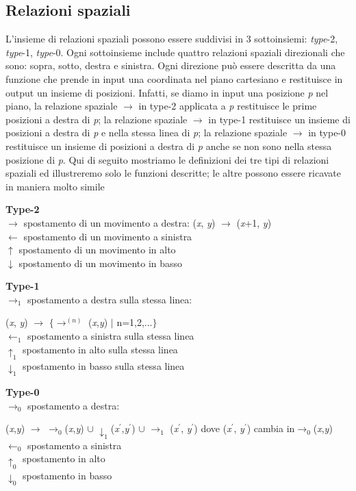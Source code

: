 \subsection{Relazioni spaziali}
L'insieme di relazioni spaziali \cite{pubblicazione: tomita} possono essere suddivisi in 3 sottoinsiemi: \textit{type}-2, \textit{type}-1, \textit{type}-0. Ogni sottoinsieme include quattro relazioni spaziali direzionali che sono: sopra, sotto, destra e sinistra. Ogni direzione può essere descritta da una funzione che prende in input una coordinata nel piano cartesiano e restituisce in output un insieme di posizioni. Infatti, se diamo in input una posizione \textit{p} nel piano, la relazione spaziale $\to$ in type-2 applicata a \textit{p} restituisce le prime posizioni a destra di \textit{p}; la relazione spaziale $\to$ in type-1 restituisce un insieme di posizioni a destra di \textit{p} e nella stessa linea di \textit{p}; la relazione spaziale $\to$ in type-0 restituisce un insieme di posizioni a destra di \textit{p} anche se non sono nella stessa posizione di \textit{p}. Qui di seguito mostriamo le definizioni dei tre tipi di relazioni spaziali ed illustreremo solo le funzioni descritte; le altre possono essere ricavate in maniera molto simile
\begin{flushleft}
	\textbf{Type-2}  \\
	$\to$   spostamento  di un movimento a destra: (\textit{x}, \textit{y}) $\to$ (\textit{x}+1, \textit{y})\\
	$\gets$   spostamento  di un movimento a sinistra \\
	$\uparrow$   spostamento  di un movimento in alto \\
	$\downarrow$   spostamento  di un movimento in basso \par
	\vspace{0.2cm}\noindent \textbf{Type-1}  \\
	$\to_1$   spostamento a destra sulla stessa linea:\par 
	\hspace{0.5cm}(\textit{x}, \textit{y}) $\to$ $\{$$\to^{(n)}$  (\textit{x},\textit{y}) $\mid$ n=1,2,$\dots$$\}$ \\
	$\gets_1$ spostamento a sinistra sulla stessa linea\\
	$\uparrow_1$ spostamento in alto sulla stessa linea\\
	$\downarrow_1$ spostamento in basso sulla stessa linea \par
	\vspace{0.2cm}\noindent \textbf{Type-0}  \\
	$\to_0$  spostamento a destra: \par 
	(\textit{x},\textit{y}) $\to$   $\to_0$(\textit{x},\textit{y})  $\cup$ $\downarrow_1$(\textit{x}$^{'}$,\textit{y}$^{'}$) $\cup$ $\to_1$ (\textit{x}$^{'}$, \textit{y}$^{'}$) dove (\textit{x}$^{'}$, \textit{y}$^{'}$) cambia in$\to_0$(\textit{x},\textit{y})\\
	$\gets_0$ spostamento  a sinistra \\
	$\uparrow_0$ spostamento in alto \\
	$\downarrow_0$ spostamento in basso 
\end{flushleft}
